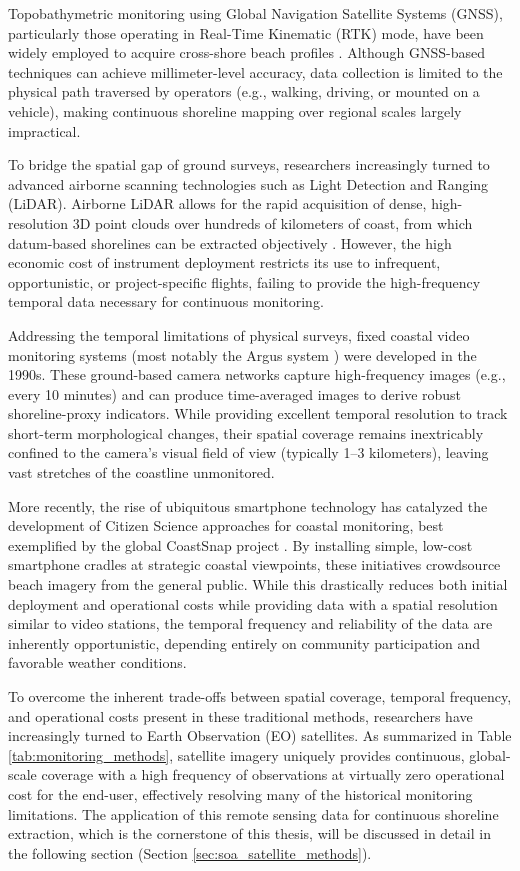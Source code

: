 ﻿\documentclass[ENG]{TFUOC}%
\begin{document}
Topobathymetric monitoring using Global Navigation Satellite Systems (GNSS), particularly those operating in Real-Time Kinematic (RTK) mode, have been widely employed to acquire cross-shore beach profiles \citep{morton_monitoring_1993}. Although GNSS-based techniques can achieve millimeter-level accuracy, data collection is limited to the physical path traversed by operators (e.g., walking, driving, or mounted on a vehicle), making continuous shoreline mapping over regional scales largely impractical.

To bridge the spatial gap of ground surveys, researchers increasingly turned to advanced airborne scanning technologies such as Light Detection and Ranging (LiDAR). Airborne LiDAR allows for the rapid acquisition of dense, high-resolution 3D point clouds over hundreds of kilometers of coast, from which datum-based shorelines can be extracted objectively \citep{stockdon_estimation_2002}. However, the high economic cost of instrument deployment restricts its use to infrequent, opportunistic, or project-specific flights, failing to provide the high-frequency temporal data necessary for continuous monitoring.

Addressing the temporal limitations of physical surveys, fixed coastal video monitoring systems (most notably the Argus system \citep{holman_application_1993}) were developed in the 1990s. These ground-based camera networks capture high-frequency images (e.g., every 10 minutes) and can produce time-averaged images to derive robust shoreline-proxy indicators. While providing excellent temporal resolution to track short-term morphological changes, their spatial coverage remains inextricably confined to the camera's visual field of view (typically 1–3 kilometers), leaving vast stretches of the coastline unmonitored.

More recently, the rise of ubiquitous smartphone technology has catalyzed the development of Citizen Science approaches for coastal monitoring, best exemplified by the global CoastSnap project \citep{harley_coastsnap_2022}. By installing simple, low-cost smartphone cradles at strategic coastal viewpoints, these initiatives crowdsource beach imagery from the general public. While this drastically reduces both initial deployment and operational costs while providing data with a spatial resolution similar to video stations, the temporal frequency and reliability of the data are inherently opportunistic, depending entirely on community participation and favorable weather conditions.

To overcome the inherent trade-offs between spatial coverage, temporal frequency, and operational costs present in these traditional methods, researchers have increasingly turned to Earth Observation (EO) satellites. As summarized in Table \ref{tab:monitoring_methods}, satellite imagery uniquely provides continuous, global-scale coverage with a high frequency of observations at virtually zero operational cost for the end-user, effectively resolving many of the historical monitoring limitations. The application of this remote sensing data for continuous shoreline extraction, which is the cornerstone of this thesis, will be discussed in detail in the following section (Section \ref{sec:soa_satellite_methods}).
\end{document}
